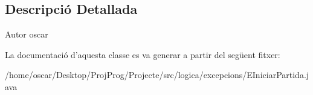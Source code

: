 \subsection{Descripció Detallada}
\begin{DoxyAuthor}{Autor}
oscar 
\end{DoxyAuthor}


La documentació d'aquesta classe es va generar a partir del següent fitxer\+:\begin{DoxyCompactItemize}
\item 
/home/oscar/\+Desktop/\+Proj\+Prog/\+Projecte/src/logica/excepcions/E\+Iniciar\+Partida.\+java\end{DoxyCompactItemize}
